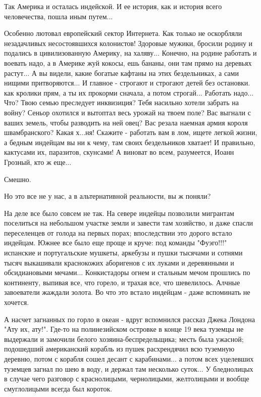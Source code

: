 Так Америка и осталась индейской. И ее история, как и история всего
человечества, пошла иным путем...

Особенно лютовал европейский сектор Интернета. Как только не оскорбляли
незадачливых несостоявшихся колонистов! Здоровые мужики, бросили родину и
подались в цивилизованную Америку, на халяву... Конечно, на родине работать и
воевать надо, а в Америке жуй кокосы, ешь бананы, они там прямо на деревьях
растут... А вы видели, какие богатые кафтаны на этих бездельниках, а сами
нищими притворяются... И главное - строгают и строгают детей без остановки. как
кролики прям, а ты их прокорми сначала, а потом строгай... Работать надо...
Что? Твою семью преследует инквизиция? Тебя насильно хотели забрать на войну?
Сеньор охотился и вытоптал весь урожай на твоем поле? Вас выгнали с ваших
земель, чтобы разводить на ней овец? Вас резала наемная армия короля
швамбранского? Какая х...ня! Скажите - работать вам в лом, ищете легкой жизни,
а бедным индейцам вы ни к чему, там своих бездельников хватает! И правильно,
кактусами их, паразитов, скунсами! А виноват во всем, разумеется, Иоанн
Грозный, кто ж еще... 

Смешно.

Но это все не у нас, а в альтернативной реальности, вы ж поняли?

На деле все было совсем не так. На севере индейцы позволили мигрантам
поселиться на небольшом участке земли и завести там хозяйство, и даже спасли
переселенцев от голода на первых порах; впоследствии это дорого встало
индейцам. Южнее все было еще проще и круче: под команды "Фуэго!!!" испанские и
португальские мушкеты, аркебузы и пушки тысячами и сотнями тысяч выкашивали
краснокожих аборигенов с их луками и деревянными и обсидиановыми мечами...
Конкистадоры огнем и стальным мечом прошлись по континенту, выпивая все, что
горело, и трахая все, что шевелилось. Алчные завоеватели жаждали золота. Во что
это встало индейцам - даже вспоминать не хочется.

А насчет загнанных по горло в океан - вдруг вспомнился рассказ Джека Лондона
"Ату их, ату!". Где-то на полинезийском островке в конце 19 века туземцы не
выдержали и замочили белого хозяина-беспредельщика; месть была ужасной;
подошедший американский корабль из пушек расхрендячил всю туземную деревню,
потом с корабля сошел десант с карабинами... а потом всех уцелевших туземцев
загнал по шею в воду, и держал там несколько суток... У бледнолицых в случае
чего разговор с краснолицыми, чернолицыми, желтолицыми и вообще смуглолицыми
всегда был короток.  

